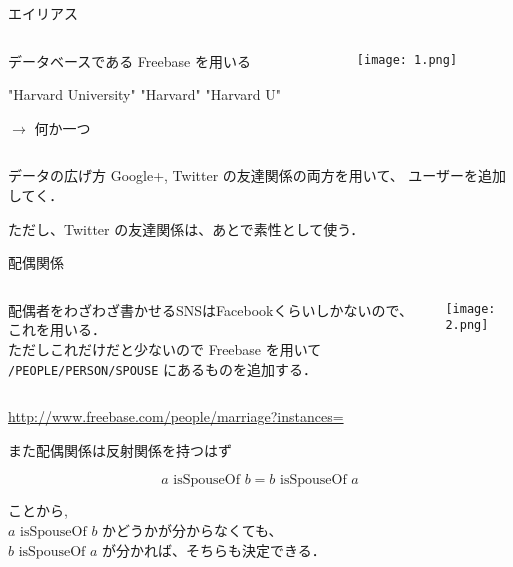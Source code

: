 \documentclass[12pt, dvipdfmx, default, cjk]{beamer}
\begin{document}
\begin{frame}{エイリアス}
  \begin{columns}
    \begin{column}{0.5\textwidth}
      データベースである Freebase を用いる

      \vfill

      "Harvard University"
      "Harvard"
      "Harvard U"

      $\rightarrow$ 何か一つ
    \end{column}
    \begin{column}{0.5\textwidth}
      \texttt{[image: 1.png]}
    \end{column}
  \end{columns}
\end{frame}

\begin{frame}{データの広げ方}
  Google+, Twitter の友達関係の両方を用いて、
  ユーザーを追加してく．

  ただし、Twitter の友達関係は、あとで素性として使う．
\end{frame}

\begin{frame}[fragile]{配偶関係}
  \begin{columns}
    \begin{column}{0.5\textwidth}
      配偶者をわざわざ書かせるSNSはFacebookくらいしかないので、
      これを用いる． \\

      ただしこれだけだと少ないので
      Freebase
      を用いて
      \verb+/PEOPLE/PERSON/SPOUSE+
      にあるものを追加する．
    \end{column}
    \begin{column}{0.5\textwidth}
      \texttt{[image: 2.png]}
    \end{column}
  \end{columns}
  \url{http://www.freebase.com/people/marriage?instances=}
\end{frame}

\def\isSpouseOf{\textrm{ isSpouseOf }}

\begin{frame}
  また配偶関係は反射関係を持つはず

  \[ a \isSpouseOf b = b \isSpouseOf a \]

  ことから, \\
  $a \isSpouseOf b$ かどうかが分からなくても、 \\
  $b \isSpouseOf a$ が分かれば、そちらも決定できる．

\end{frame}
\end{document}
